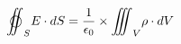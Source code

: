 \documentclass[preview]{standalone}
\begin{document}
\begin{align*}
\def\ooint{{\bigcirc}\kern-12.5pt{\int}\kern-6.5pt{\int}}\ooint_S{E\cdot dS} = {1\over{\epsilon_0}}\times{{\int}\kern-6.5pt{\int}\kern-6.5pt{\int}_V{\rho \cdot dV}}
\end{align*}
\end{document}
